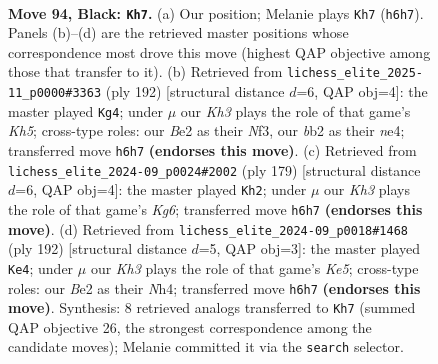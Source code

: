 \documentclass[11pt]{article}
\begin{document}
\clearpage

\begin{figure}[p]\centering
\begin{subfigure}{0.46\textwidth}\centering
\resizebox{\linewidth}{!}{%
\newchessgame
\chessboard[
  setfen={8/8/7k/8/1n6/6K1/1B2bP2/8 b - - 34 94},
  showmover=false,
  pgfstyle=straightmove, color=movearrow, markmove={h6-h7}
]}
\caption{}
\end{subfigure}\hfill
\begin{subfigure}{0.46\textwidth}\centering
\resizebox{\linewidth}{!}{%
\newchessgame
\chessboard[
  setfen={8/8/8/7K/4n3/5N2/6p1/5k2 w - - 0 97},
  showmover=false,
  pgfstyle=straightmove, color=movearrow, markmove={h5-g4}
]}
\caption{}
\end{subfigure}
\\[4pt]
\begin{subfigure}{0.46\textwidth}\centering
\resizebox{\linewidth}{!}{%
\newchessgame
\chessboard[
  setfen={8/8/5K2/6P1/8/3b2k1/8/8 b - - 2 90},
  showmover=false,
  pgfstyle=straightmove, color=movearrow, markmove={g3-h2}
]}
\caption{}
\end{subfigure}\hfill
\begin{subfigure}{0.46\textwidth}\centering
\resizebox{\linewidth}{!}{%
\newchessgame
\chessboard[
  setfen={8/8/8/4K3/6bN/6p1/5k2/8 w - - 20 97},
  showmover=false,
  pgfstyle=straightmove, color=movearrow, markmove={e5-e4}
]}
\caption{}
\end{subfigure}
\caption{\textbf{Move 94, Black: \texttt{Kh7}.} (a) Our position; Melanie plays \texttt{Kh7} (\texttt{h6h7}). Panels (b)--(d) are the retrieved master positions whose correspondence most drove this move (highest QAP objective among those that transfer to it). (b) Retrieved from \texttt{lichess\_elite\_2025-11\_p0000\#3363} (ply 192) [structural distance $d$=6, QAP obj=4]: the master played \texttt{Kg4}; under $\mu$ our \emph{Kh3} plays the role of that game's \emph{Kh5}; cross-type roles: our \emph{B}e2 as their \emph{N}f3, our \emph{b}b2 as their \emph{n}e4; transferred move \texttt{h6h7} \textbf{(endorses this move)}. (c) Retrieved from \texttt{lichess\_elite\_2024-09\_p0024\#2002} (ply 179) [structural distance $d$=6, QAP obj=4]: the master played \texttt{Kh2}; under $\mu$ our \emph{Kh3} plays the role of that game's \emph{Kg6}; transferred move \texttt{h6h7} \textbf{(endorses this move)}. (d) Retrieved from \texttt{lichess\_elite\_2024-09\_p0018\#1468} (ply 192) [structural distance $d$=5, QAP obj=3]: the master played \texttt{Ke4}; under $\mu$ our \emph{Kh3} plays the role of that game's \emph{Ke5}; cross-type roles: our \emph{B}e2 as their \emph{N}h4; transferred move \texttt{h6h7} \textbf{(endorses this move)}. Synthesis: 8 retrieved analogs transferred to \texttt{Kh7} (summed QAP objective 26, the strongest correspondence among the candidate moves); Melanie committed it via the \texttt{search} selector.}
\label{fig:thought-m187}
\end{figure}
\end{document}

